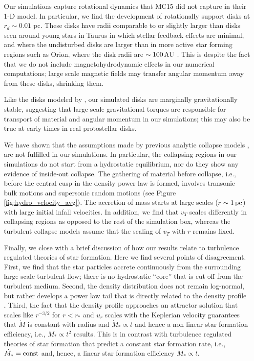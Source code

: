\documentclass[../dissertation.tex]{subfiles}
\begin{document}
Our simulations capture rotational dynamics that MC15 did not capture in their 1-D model.  
In particular, we find the development of rotationally support disks at $r_d \sim 0.01$ pc.  
These disks have radii comparable to  or slightly larger than disks seen around 
young stars in Taurus \citep{1999AJ....117.1490P} in which stellar feedback effects are minimal,
and where the undisturbed disks are larger than in more active star forming regions such as Orion, 
where the disk radii are $\sim 100\,\rm AU$ \citep{2011ARA&A..49...67W}.  
This is despite the fact that we do not include magnetohydrodynamic effects 
in our numerical computations;  large scale magnetic fields may transfer angular 
momentum away from these disks, shrinking them.  

Like the disks modeled by \citet{2010ApJ...708.1585K},
our simulated disks are 
marginally gravitationally stable, suggesting that large scale gravitational torques are 
responsible for transport of material and angular momentum in our simulations; this may
also be true at early times in real protostellar disks.  

We have shown that the assumptions made by previous analytic collapse models
\citep{1977ApJ...214..488S,1992ApJ...396..631M,1997ApJ...476..750M,2003ApJ...585..850M}, 
are not fulfilled in our simulations.  In particular, 
the collapsing regions in our simulations do not start from a hydrostatic equilibrium, nor 
do they show any evidence of inside-out collapse.  The gathering of material before collapse, i.e.,
before the central cusp in the density power law is formed, involves transonic bulk motions 
and supersonic random motions (see Figure \ref{fig:hydro_velocity_avg}). The accretion of mass starts at large 
scales ($r\sim 1\,\rm pc$) with large initial infall velocities.  In addition, we find that $v_T$ 
scales differently in collapsing regions as opposed to the rest of the simulation box, 
whereas the turbulent collapse models \citep{1997ApJ...476..750M,2003ApJ...585..850M} assume 
that the scaling of $v_T$ with $r$ remains fixed.  

Finally, we close with a brief discussion of how our results relate to turbulence regulated theories of star formation. Here we find several points of disagreement. 
First, we find that the star 
particles accrete continuously from the surrounding large scale turbulent flow; there is 
no hydrostatic ``core'' that is cut-off from the turbulent medium. Second, 
the density distribution does not remain log-normal, but rather develops a power law tail that 
is directly related to the density profile \citep{2011ApJ...727L..20K,2015ApJ...800...49L}.  
Third, the fact that the density profile approaches an attractor solution that scales like 
$r^{-3/2}$ for $r<r_*$ and $u_r$ scales with the Keplerian velocity guarantees that $\dot{M}$ is 
constant with radius and $\dot{M}_*\propto t$ and hence a non-linear star formation efficiency, 
i.e., $M_* \propto t^2$ results. This is in contrast with turbulence regulated theories of star 
formation that predict a constant star formation rate, i.e., $\dot{M}_* = {\rm const}$ and, 
hence, a linear star formation efficiency $M_* \propto t$. 
\end{document}
